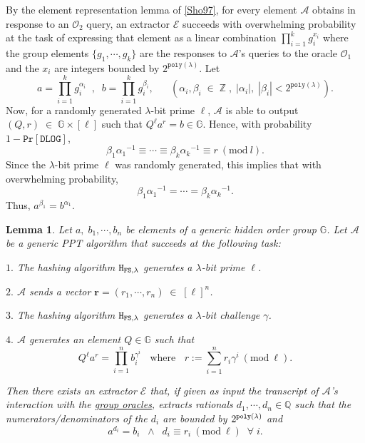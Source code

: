 \documentclass[11pt, lettersize, notitlepage, leqno, footskip=0.6cm]{article}
\newcommand{\bz}{\mathbb Z}
\newcommand{\bq}{\mathbb Q}
\newcommand{\pl}{\prod\limits}
\newcommand{\slim}{\sum\limits}
\newcommand{\ttt}{\texttt}
\newcommand{\bG}{\mathbb{G}}
\newcommand{\mc}{\mathcal}
\newcommand{\mb}{\mathbb}
\newcommand{\mbf}{\mathbf}
\newcommand{\al}{\alpha}
\newcommand{\be}{\beta}
\newcommand{\lam}{\lambda}
\newcommand{\A}{\mc{A}}
\newcommand{\vs}{\vspace{-0.15cm}}
\newcommand{\noin}{\noindent}
\newcommand{\op}{overwhelming probability}
\newcommand{\Mod}[1]{\ (\mathrm{mod}\ #1)}
\newcommand{\E}{\mc{E}}
\newtheorem{Lem}[Thm]{Lemma}
\numberwithin{equation}{section}
\begin{document}
\begin{prf} By the element representation lemma of \hyperlink{Sho97}{[Sho97]}, for every element $\mc{A}$ obtains in response to an $\mc{O}_2$ query, an extractor $\E$ succeeds with overwhelming probability at the task of expressing that element as a linear combination $\prod_{i=1}^k g_i^{x_i}$ where the group elements $\{g_1,\cdots,g_k\}$ are the responses to $\A$'s queries to the oracle $\mc{O}_1$ and the $x_i$ are integers bounded by $2^{\ttt{poly}(\lam)}$. Let \vspace{-0.3cm} $$a = \pl_{i=1}^k g_i^{\al_i}\;\;,\;\; b = \pl_{i=1}^k g_i^{\be_i},\;\;\;\;\;\;(\al_i,\be_i\;\in\;\bz\;,\;|\al_i|,\;|\be_{i}| < 2^{\ttt{poly}(\lam)}).$$ Now, for a randomly generated $\lam$-bit prime $\ell$, $\mc{A}$ is able to output $(Q, r)\; \in\;\bG \times [\ell]$ such that $Q^{\ell}a^r = b\in \bG$. Hence, with probability $1-\ttt{Pr}[\ttt{DLOG}]$,  \vs $${\be_1}{\al_1}^{-1}\equiv\cdots\equiv {\be_k}{\al_k}^{-1}\equiv r \Mod{l}.$$ Since the $\lam$-bit prime $\ell$ was randomly generated, this implies that with \op, \vs $${\be_1}{\al_1}^{-1} = \cdots =  {\be_k}{\al_k}^{-1}.$$ Thus, $a^{\be_1} = b^{\al_1}$. \end{prf}
\vspace{0.1cm}



\begin{Lem} \label{aggroot} Let $a,\; b_1,\cdots,b_n$ be elements of a generic hidden order group $\bG$. Let $\mc{A}$ be a generic PPT algorithm that succeeds at the following task:

\noin $1.$ The hashing algorithm ${\tt{H}}_{{\tt{FS}},\lam}$ generates a $\lam$-bit prime $\ell$.

\noin $2.$ $\mc{A}$ sends a vector $\mbf{r} = (r_1,\cdots,r_n)\;\in\; [\ell]^n$.

\noin $3.$ The hashing algorithm ${\tt{H}}_{{\tt{FS}},\lam}$ generates a $\lam$-bit challenge $\gamma$.

\noin $4.$ $\mc{A}$ generates an element $Q\in \mb{G}$ such that \vs $$Q^{\ell}a^r = \pl_{i=1}^n b_i^{\gamma^i}\;\;\text{ where }\;\; r:= \slim_{i=1}^n r_i\gamma^i\Mod{\ell}.$$

\noin Then there exists an extractor \hspace{0.05cm}$\E$ that, if given as input the transcript of $\A$'s interaction with the \hyperlink{Oracles}{group oracles}, extracts rationals $d_1,\cdots,d_n\in\bq$ such that the numerators/denominators of the $d_i$ are bounded by $2^{\tt{poly}(\lam)}$ and \vs $$a^{d_i} = b_i \;\;\wedge\;\; d_i\equiv r_i\Mod{\ell}\;\;\forall\;i.$$ \end{Lem} 
\end{document}
